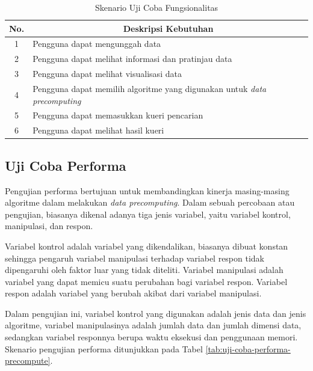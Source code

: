 \begin{table}[H]
	\centering
	\begin{tabular}{ | c | p{8cm} | }
		\hline
		\multicolumn{1}{|c}{\textbf{No.}} & \multicolumn{1}{|c|}{\textbf{Deskripsi Kebutuhan}} \\ \hline \hline
		1 & Pengguna dapat mengunggah data \\ \hline
		2 & Pengguna dapat melihat informasi dan pratinjau data \\ \hline
		3 & Pengguna dapat melihat visualisasi data  \\ \hline
		4 & Pengguna dapat memilih algoritme yang digunakan untuk \textit{data precomputing}\\ \hline
		5 & Pengguna dapat memasukkan kueri pencarian \\ \hline
		6 & Pengguna dapat melihat hasil kueri \\ \hline
	\end{tabular} \caption{Skenario Uji Coba Fungsionalitas}
	\label{tab:uji-coba-fungsional}
\end{table}

\subsection{Uji Coba Performa}
\tab Pengujian performa bertujuan untuk membandingkan kinerja masing-masing algoritme dalam melakukan \textit{data precomputing}. Dalam sebuah percobaan atau pengujian, biasanya dikenal adanya tiga jenis variabel, yaitu variabel kontrol, manipulasi, dan respon. 

Variabel kontrol adalah variabel yang dikendalikan, biasanya dibuat konstan sehingga pengaruh variabel manipulasi terhadap variabel respon tidak dipengaruhi oleh faktor luar yang tidak diteliti. Variabel manipulasi adalah variabel yang dapat memicu suatu perubahan bagi variabel respon. Variabel respon adalah variabel yang berubah akibat dari variabel manipulasi.

Dalam pengujian ini, variabel kontrol yang digunakan adalah jenis data dan jenis algoritme, variabel manipulasinya adalah jumlah data dan jumlah dimensi data, sedangkan variabel responnya berupa waktu eksekusi dan penggunaan memori. Skenario pengujian performa ditunjukkan pada Tabel \ref{tab:uji-coba-performa-precompute}.

